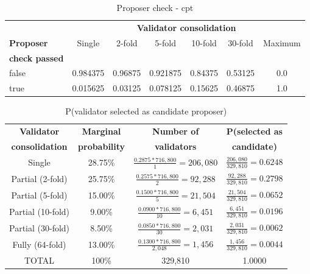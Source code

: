 \begin{table}[htp]
\caption{Proposer check - \gls{cpt}}
\begin{center}
\begin{tabular}{|l|c|c|c|c|c|c|}
\hline
& \multicolumn{6}{c|}{\textbf{Validator consolidation}} \\
\cline{2-7}
\textbf{Proposer}  & Single & 2-fold & 5-fold & 10-fold  & 30-fold & Maximum \\
\textbf{check passed}       &            &           &           &              &              & \\
\hline
false  & 0.984375 & 0.96875 & 0.921875 &0.84375 & 0.53125 & 0.0 \\
 true  & 0.015625 & 0.03125 & 0.078125 &0.15625 & 0.46875 & 1.0 \\
 \hline
\end{tabular}
\end{center}
\label{tbl:proposercheck}
\end{table}%


\begingroup
\renewcommand{\arraystretch}{1.5} %
\begin{table}[htp]
\caption{P(validator selected as candidate proposer)}
\label{tbl:candidate}
\begin{center}
\begin{tabular}{|c|c|c|c|}
\hline
\textbf{Validator} & \textbf{Marginal} & \textbf{Number of} & \textbf{P(selected as} \\
\textbf{consolidation} & \textbf{probability } & \textbf{validators} &\textbf{ candidate)}  \\
\hline
Single & 28.75\% & $\frac{0.2875 * 716,800}{1} = 206,080$ & $\frac{206,080}{329,810} = 0.6248$ \\
Partial (2-fold) & 25.75\% &  $\frac{0.2575 * 716,800}{2} = 92,288$ & $\frac{92,288}{329,810} = 0.2798$ \\
Partial (5-fold) & 15.00\% &  $\frac{0.1500 * 716,800}{5} =  21,504$ & $\frac{21,504}{329,810} =  0.0652$ \\
Partial (10-fold) & 9.00\% &  $\frac{0.0900 * 716,800}{10} = 6,451$ & $\frac{6,451}{329,810} = 0.0196$ \\
Partial (30-fold) & 8.50\% &  $\frac{0.0850 * 716,800}{30} = 2,031$ & $\frac{2,031}{329,810} = 0.0062$ \\
Fully (64-fold) & 13.00\% &  $\frac{0.1300 * 716,800}{2,048} = 1,456 $ & $\frac{1,456}{329,810} =  0.0044$\\
\hline
TOTAL & 100\% & 329,810 & 1.0000 \\
\hline

\end{tabular}
\end{center}
\end{table}%
\endgroup

